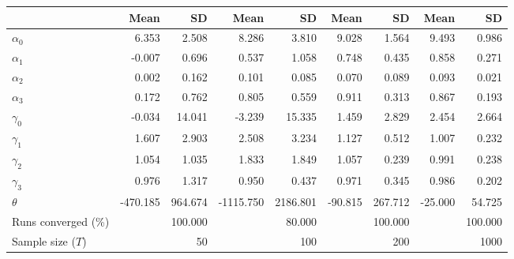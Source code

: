 
\begin{tabular}[t]{lrrrrrrrr}
\toprule
  & Mean & SD & Mean  & SD  & Mean   & SD   & Mean    & SD   \\
\midrule
$\alpha_{0}$ & 6.353 & 2.508 & 8.286 & 3.810 & 9.028 & 1.564 & 9.493 & 0.986\\
$\alpha_{1}$ & -0.007 & 0.696 & 0.537 & 1.058 & 0.748 & 0.435 & 0.858 & 0.271\\
$\alpha_{2}$ & 0.002 & 0.162 & 0.101 & 0.085 & 0.070 & 0.089 & 0.093 & 0.021\\
$\alpha_{3}$ & 0.172 & 0.762 & 0.805 & 0.559 & 0.911 & 0.313 & 0.867 & 0.193\\
$\gamma_{0}$ & -0.034 & 14.041 & -3.239 & 15.335 & 1.459 & 2.829 & 2.454 & 2.664\\
$\gamma_{1}$ & 1.607 & 2.903 & 2.508 & 3.234 & 1.127 & 0.512 & 1.007 & 0.232\\
$\gamma_{2}$ & 1.054 & 1.035 & 1.833 & 1.849 & 1.057 & 0.239 & 0.991 & 0.238\\
$\gamma_{3}$ & 0.976 & 1.317 & 0.950 & 0.437 & 0.971 & 0.345 & 0.986 & 0.202\\
$\theta$ & -470.185 & 964.674 & -1115.750 & 2186.801 & -90.815 & 267.712 & -25.000 & 54.725\\
Runs converged (\%) &  & 100.000 &  & 80.000 &  & 100.000 &  & 100.000\\
Sample size ($T$) &  & 50 &  & 100 &  & 200 &  & 1000\\
\bottomrule
\end{tabular}
